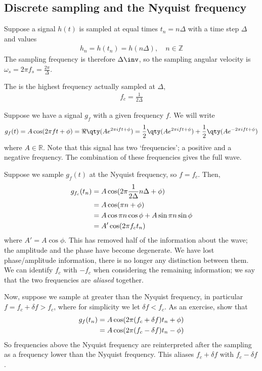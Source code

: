 \subsection{Discrete sampling and the Nyquist frequency}
Suppose a signal $h(t)$ is sampled at equal times $t_n = n\Delta$ with a time step $\Delta$ and values
\begin{align} \label{eq:8.36}
	h_n = h(t_n) = h(n\Delta),\quad n \in \mathbb{Z}
\end{align}
The sampling frequency is therefore $\Delta\inv$, so the sampling angular velocity is $\omega_s = 2\pi f_s = \frac{2\pi}{\Delta}$.

\begin{definition}
	The  is the highest frequency actually sampled at $\Delta$,
	\begin{align} \label{eq:8.37}
		f_c = \frac{1}{2 \Delta}
	\end{align} 
\end{definition} 

Suppose we have a signal $g_f$ with a given frequency $f$.
We will write
\begin{align} \label{eq:8.38}
	g_f(t) = A \cos(2\pi f t + \phi) = \Re \qty(A e^{2 \pi i f t + \phi}) = \frac{1}{2} \qty(A e^{2 \pi i f t + \phi}) + \frac{1}{2} \qty(A e^{-2 \pi i f t + \phi})
\end{align}
where $A \in \mathbb R$.
Note that this signal has two `frequencies'; a positive and a negative frequency.
The combination of these frequencies gives the full wave.

Suppose we sample $g_f(t)$ at the Nyquist frequency, so $f = f_c$.
Then,
\begin{align}
	g_{f_c}(t_n) & = A \cos(2 \pi \frac{1}{2\Delta} n \Delta + \phi) \notag \\
	& = A \cos(\pi n + \phi) \notag \\
	& = A \cos \pi n \cos \phi + A \sin \pi n \sin \phi \notag \\
	& = A' \cos(2\pi f_c t_n) \label{eq:8.39}
\end{align}
where $A' = A \cos \phi$.
This has removed half of the information about the wave; the amplitude and the phase have become degenerate.
We have lost phase/amplitude information, there is no longer any distinction between them.
We can identify $f_c$ with $-f_c$ when considering the remaining information; we say that the two frequencies are \textit{aliased} together.

Now, suppose we sample at greater than the Nyquist frequency, in particular $f = f_c + \delta f > f_c$, where for simplicity we let $\delta f < f_c$.
As an exercise, show that
\begin{align}
	g_f(t_n) &= A \cos(2\pi (f_c + \delta f)t_n + \phi) \notag \\
	&= A \cos(2\pi (f_c - \delta f)t_n - \phi) \label{eq:8.40}
\end{align}
So frequencies above the Nyquist frequency are reinterpreted after the sampling as a frequency lower than the Nyquist frequency.
This aliases $f_c + \delta f$ with $f_c - \delta f$.

